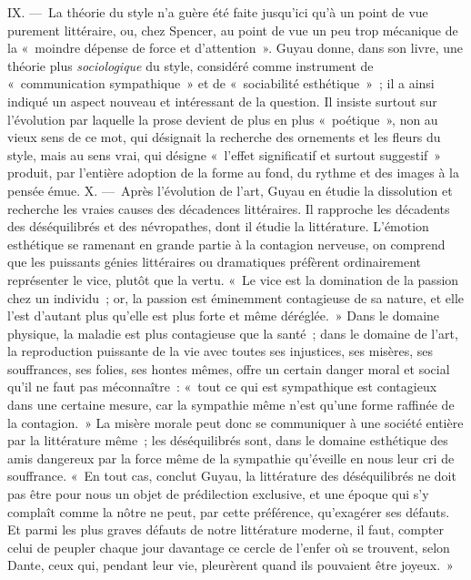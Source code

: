 \documentclass[french,twoside]{book} %
\begin{document}
IX. — La théorie du style n’a guère été faite jusqu’ici qu’à un point de vue purement littéraire, ou, chez Spencer, au point de vue un peu trop mécanique de la « moindre dépense de force et d’attention ». Guyau donne, dans son livre, une théorie plus \emph{sociologique} du style, considéré comme instrument de « communication sympathique » et de « sociabilité esthétique » ; il a ainsi indiqué un aspect nouveau et intéressant de la question. Il insiste surtout sur l’évolution par laquelle la prose devient de plus en plus « poétique », non au vieux sens de ce mot, qui désignait la recherche des ornements et les fleurs du style, mais au sens vrai, qui désigne « l’effet significatif et surtout suggestif » produit, par l’entière adoption de la forme au fond, du rythme et des images à la pensée émue. X. — Après l’évolution de l’art, Guyau en étudie la dissolution et recherche les vraies causes des décadences littéraires. Il rapproche les décadents des déséquilibrés et des névropathes, dont il étudie la littérature. L’émotion esthétique se ramenant en grande partie à la contagion nerveuse, on comprend que les puissants génies littéraires ou dramatiques préfèrent ordinairement représenter le vice, plutôt que la vertu. « Le vice est la domination de la passion chez un individu ; or, la passion est éminemment contagieuse de sa nature, et elle l’est d’autant plus qu’elle est plus forte et même déréglée. » Dans le domaine physique, la maladie est plus contagieuse que la santé ; dans le domaine de l’art, la reproduction puissante de la vie avec toutes ses injustices, ses misères, ses souffrances, ses folies, ses hontes mêmes, offre un certain danger moral et social qu’il ne faut pas méconnaître : « tout ce qui est sympathique est contagieux dans une certaine mesure, car la sympathie même n’est qu’une forme raffinée de la contagion. » La misère morale peut donc se communiquer à une société entière par la littérature même ; les déséquilibrés sont, dans le domaine esthétique des amis dangereux par la force même de la sympathie qu’éveille en nous leur cri de souffrance. « En tout cas, conclut Guyau, la littérature des déséquilibrés ne doit pas être pour nous un objet de prédilection exclusive, et une époque qui s’y complaît comme la nôtre ne peut, par cette préférence, qu’exagérer ses défauts. Et parmi les plus graves défauts de notre littérature moderne, il faut, compter celui de peupler chaque jour davantage ce cercle de l’enfer où se trouvent, selon Dante, ceux qui, pendant leur vie, pleurèrent quand ils pouvaient être joyeux. »\par
\end{document}
